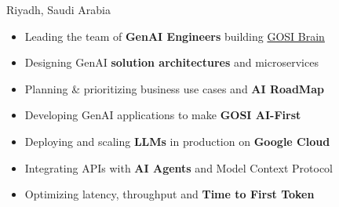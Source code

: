 \documentclass[10pt,a4paper,ragged2e]{altacv}
\begin{document}

\begin{fullwidth}
\makecvheader
\end{fullwidth}



     {Riyadh, Saudi Arabia}

\begin{itemize}
	\item Leading the team of \textbf{GenAI Engineers} building \href{https://my.gov.sa/en/news/678306}{GOSI Brain}
	\item Designing GenAI \textbf{solution architectures} and microservices
	\item Planning \& prioritizing business use cases and \textbf{AI RoadMap}
	\item Developing GenAI applications to make \textbf{GOSI AI-First}
	\item Deploying and scaling \textbf{LLMs} in production on \textbf{Google Cloud}
	\item Integrating APIs with \textbf{AI Agents} and Model Context Protocol
	\item Optimizing latency, throughput and \textbf{Time to First Token}
	
\end{itemize}
\end{document}
